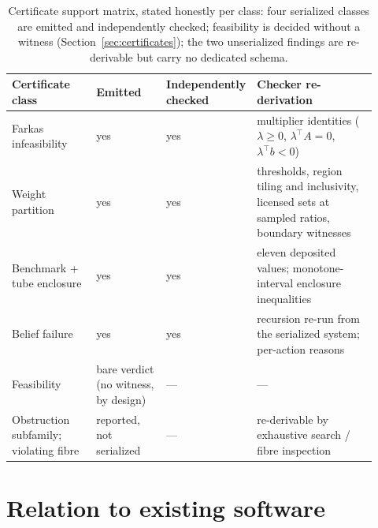 \documentclass[3p,11pt]{elsarticle}
\begin{document}
\begin{table}[t]
\centering\small
\setlength{\tabcolsep}{3pt}
\begin{tabular}{@{}p{0.24\linewidth}p{0.20\linewidth}p{0.12\linewidth}p{0.36\linewidth}@{}}
\toprule
Certificate class & Emitted & Independently checked & Checker re-derivation \\
\midrule
Farkas infeasibility & yes & yes & multiplier identities
($\lambda \geq 0$, $\lambda^{\top} A = 0$, $\lambda^{\top} b < 0$) \\
Weight partition & yes & yes & thresholds, region tiling and
inclusivity, licensed sets at sampled ratios, boundary witnesses \\
Benchmark + tube enclosure & yes & yes & eleven deposited values;
monotone-interval enclosure inequalities \\
Belief failure & yes & yes & recursion re-run from the serialized
system; per-action reasons \\
Feasibility & bare verdict (no witness, by design) & --- & --- \\
Obstruction subfamily; violating fibre & reported, not serialized &
--- & re-derivable by exhaustive search / fibre inspection \\
\bottomrule
\end{tabular}
\caption{Certificate support matrix, stated honestly per class: four
serialized classes are emitted and independently checked; feasibility is
decided without a witness (Section~\ref{sec:certificates}); the two
unserialized findings are re-derivable but carry no dedicated schema.}
\label{tab:certmatrix}
\end{table}

\section{Relation to existing software}\label{sec:related}
\end{document}
